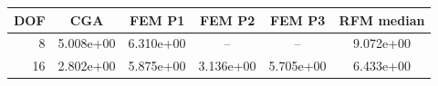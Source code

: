 \begin{tabular}{rccccc}
\toprule
DOF & CGA & FEM P1 & FEM P2 & FEM P3 & RFM median \\
\midrule
8 & 5.008e+00 & 6.310e+00 & -- & -- & 9.072e+00 \\
16 & 2.802e+00 & 5.875e+00 & 3.136e+00 & 5.705e+00 & 6.433e+00 \\
\bottomrule
\end{tabular}
